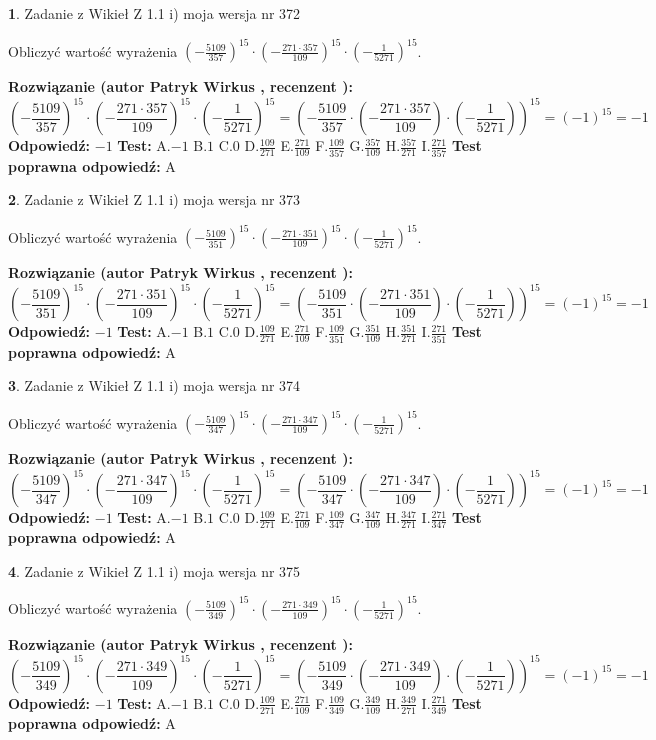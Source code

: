 \documentclass[12pt, a4paper]{article}
\theoremstyle{definition} %
\newtheorem{zad}{}
\newcommand{\zadStart}[1]{\begin{zad}#1\newline}
\newcommand{\zadStop}{\end{zad}}
\newcommand{\rozwStart}[2]{\noindent \textbf{Rozwiązanie (autor #1 , recenzent #2): }\newline}
\newcommand{\rozwStop}{\newline}
\newcommand{\odpStart}{\noindent \textbf{Odpowiedź:}\newline}
\newcommand{\odpStop}{\newline}
\newcommand{\testStart}{\noindent \textbf{Test:}\newline}
\newcommand{\testStop}{\newline}
\newcommand{\kluczStart}{\noindent \textbf{Test poprawna odpowiedź:}\newline}
\newcommand{\kluczStop}{\newline}
\begin{document}
\zadStart{Zadanie z Wikieł Z 1.1 i) moja wersja nr 372}

Obliczyć wartość wyrażenia $(-\frac{5109}{357})^{15} \cdot (-\frac{271 \cdot 357}{109})^{15} \cdot (-\frac{1}{5271})^{15}$.
\zadStop
\rozwStart{Patryk Wirkus}{}
$$(-\frac{5109}{357})^{15} \cdot (-\frac{271 \cdot 357}{109})^{15} \cdot (-\frac{1}{5271})^{15} = (-\frac{5109}{357} \cdot (-\frac{271 \cdot 357}{109}) \cdot (-\frac{1}{5271}))^{15} = (-1)^{15} = -1$$
\rozwStop
\odpStart
$-1$
\odpStop
\testStart
A.$-1$ B.$1$ C.$0$ D.$\frac{109}{271}$ E.$\frac{271}{109}$
F.$\frac{109}{357}$ G.$\frac{357}{109}$
H.$\frac{357}{271}$
I.$\frac{271}{357}$
\testStop
\kluczStart
A
\kluczStop



\zadStart{Zadanie z Wikieł Z 1.1 i) moja wersja nr 373}

Obliczyć wartość wyrażenia $(-\frac{5109}{351})^{15} \cdot (-\frac{271 \cdot 351}{109})^{15} \cdot (-\frac{1}{5271})^{15}$.
\zadStop
\rozwStart{Patryk Wirkus}{}
$$(-\frac{5109}{351})^{15} \cdot (-\frac{271 \cdot 351}{109})^{15} \cdot (-\frac{1}{5271})^{15} = (-\frac{5109}{351} \cdot (-\frac{271 \cdot 351}{109}) \cdot (-\frac{1}{5271}))^{15} = (-1)^{15} = -1$$
\rozwStop
\odpStart
$-1$
\odpStop
\testStart
A.$-1$ B.$1$ C.$0$ D.$\frac{109}{271}$ E.$\frac{271}{109}$
F.$\frac{109}{351}$ G.$\frac{351}{109}$
H.$\frac{351}{271}$
I.$\frac{271}{351}$
\testStop
\kluczStart
A
\kluczStop



\zadStart{Zadanie z Wikieł Z 1.1 i) moja wersja nr 374}

Obliczyć wartość wyrażenia $(-\frac{5109}{347})^{15} \cdot (-\frac{271 \cdot 347}{109})^{15} \cdot (-\frac{1}{5271})^{15}$.
\zadStop
\rozwStart{Patryk Wirkus}{}
$$(-\frac{5109}{347})^{15} \cdot (-\frac{271 \cdot 347}{109})^{15} \cdot (-\frac{1}{5271})^{15} = (-\frac{5109}{347} \cdot (-\frac{271 \cdot 347}{109}) \cdot (-\frac{1}{5271}))^{15} = (-1)^{15} = -1$$
\rozwStop
\odpStart
$-1$
\odpStop
\testStart
A.$-1$ B.$1$ C.$0$ D.$\frac{109}{271}$ E.$\frac{271}{109}$
F.$\frac{109}{347}$ G.$\frac{347}{109}$
H.$\frac{347}{271}$
I.$\frac{271}{347}$
\testStop
\kluczStart
A
\kluczStop



\zadStart{Zadanie z Wikieł Z 1.1 i) moja wersja nr 375}

Obliczyć wartość wyrażenia $(-\frac{5109}{349})^{15} \cdot (-\frac{271 \cdot 349}{109})^{15} \cdot (-\frac{1}{5271})^{15}$.
\zadStop
\rozwStart{Patryk Wirkus}{}
$$(-\frac{5109}{349})^{15} \cdot (-\frac{271 \cdot 349}{109})^{15} \cdot (-\frac{1}{5271})^{15} = (-\frac{5109}{349} \cdot (-\frac{271 \cdot 349}{109}) \cdot (-\frac{1}{5271}))^{15} = (-1)^{15} = -1$$
\rozwStop
\odpStart
$-1$
\odpStop
\testStart
A.$-1$ B.$1$ C.$0$ D.$\frac{109}{271}$ E.$\frac{271}{109}$
F.$\frac{109}{349}$ G.$\frac{349}{109}$
H.$\frac{349}{271}$
I.$\frac{271}{349}$
\testStop
\kluczStart
A
\kluczStop
\end{document}

